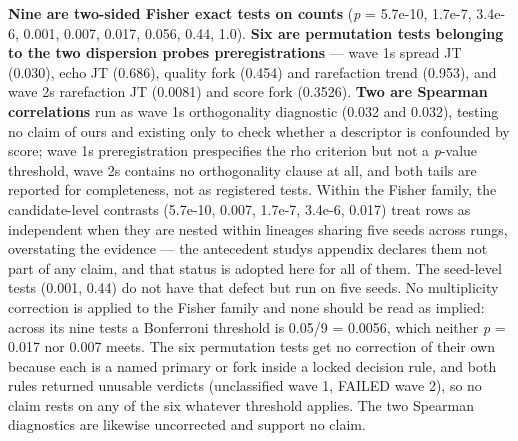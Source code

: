 \textbf{Nine are two-sided Fisher exact tests on counts} (\emph{p} = 5.7e-10, 1.7e-7, 3.4e-6, 0.001, 0.007, 0.017, 0.056, 0.44, 1.0). \textbf{Six are permutation tests belonging to the two dispersion probes\textquotesingle{} preregistrations} --- wave 1\textquotesingle s spread JT (0.030), echo JT (0.686), quality fork (0.454) and rarefaction trend (0.953), and wave 2\textquotesingle s rarefaction JT (0.0081) and score fork (0.3526). \textbf{Two are Spearman correlations} run as wave 1\textquotesingle s orthogonality diagnostic (0.032 and 0.032), testing no claim of ours and existing only to check whether a descriptor is confounded by score; wave 1\textquotesingle s preregistration prespecifies the \textbar rho\textbar{} criterion but not a \emph{p}-value threshold, wave 2\textquotesingle s contains no orthogonality clause at all, and both tails are reported for completeness, not as registered tests. Within the Fisher family, the candidate-level contrasts (5.7e-10, 0.007, 1.7e-7, 3.4e-6, 0.017) treat rows as independent when they are nested within lineages sharing five seeds across rungs, overstating the evidence --- the antecedent study\textquotesingle s appendix declares them not part of any claim, and that status is adopted here for all of them. The seed-level tests (0.001, 0.44) do not have that defect but run on five seeds. No multiplicity correction is applied to the Fisher family and none should be read as implied: across its nine tests a Bonferroni threshold is 0.05/9 = 0.0056, which neither \emph{p} = 0.017 nor 0.007 meets. The six permutation tests get no correction of their own because each is a named primary or fork inside a locked decision rule, and both rules returned unusable verdicts (unclassified wave 1, FAILED wave 2), so no claim rests on any of the six whatever threshold applies. The two Spearman diagnostics are likewise uncorrected and support no claim.

